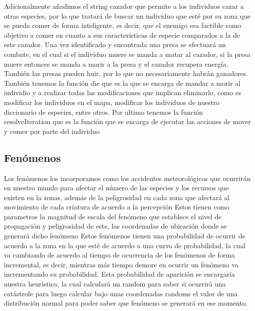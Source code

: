 \documentclass{llncs}
\begin{document}
\newline
Adicionalmente añadimos el string cazador que permite a los individuos cazar a otras especies, por lo que tratará de buscar un individuo que esté por su zona que se pueda comer de forma inteligente, es decir, que el enemigo sea factible como objetivo a comer en cuanto a sus características de especie comparados a la de este cazador.
\newline
Una vez identificado y encontrada una presa se efectuará un combate, en el cual si el individuo muere se manda a matar al cazador, si la presa muere entonces se manda a morir a la presa y el cazador recupera energía. También las presas pueden huir, por lo que no necesariamente habrán ganadores.
\newline
\newline
También tenemos la función die que es la que se encarga de mandar a morir al individio y a realizar todas las modificaciones que implican eliminarlo, como es modificar los individuos en el mapa, modificar los individuos de nuestro diccionario de especies, entre otros.
\newline
\newline
Por ultimo tenemos la función resolveIteration que es la función que se encarga de ejecutar las acciones de mover y comer por parte del individuo
 

\subsection{Fenómenos}

Los fenómenos los incorporamos como los accidentes meteorológicos que ocurrirán en nuestro mundo para afectar el número de las especies y los recursos que existen en la zonas, además de la peligrosidad en cada zona que afectará al movimiento de cada criatura de acuerdo a la percepción
\newline
\newline
Estos tienen como parametros la magnitud de escala del fenómeno que establece el nivel de propagación y peligrosidad de este, las coordenadas de ubicación donde se generará dicho fenómeno
\newline
\newline
Estos fenómenos tienen una probabilidad de ocurrir de acuerdo a la zona en la que esté de acuerdo a una curva de probabilidad, la cual va cambiando de acuerdo al tiempo de ocurrencia de los fenómenos de forma incremental, es decir, mientras más tiempo demore en ocurrir un fenómeno va incrementando su probabilidad. Esta probabilidad de aparición se encargaría nuestra heurística, la cual calculará un random para saber si ocurrirá una catástrofe para luego calcular bajo unas coordenadas randoms el valor de una distribución normal para poder saber que fenómeno se generará en ese momento.

\end{document}
